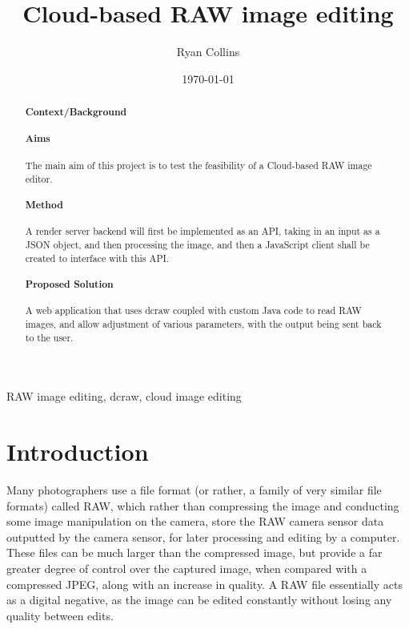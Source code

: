 \documentclass[12pt,a4paper]{article}
\title{Cloud-based RAW image editing}
\author{Ryan Collins}
\date{\today}
\begin{document}
\maketitle

\begin{abstract}
\paragraph{Context/Background}

\paragraph{Aims}
The main aim of this project is to test the feasibility of a Cloud-based RAW image
editor.
\paragraph{Method}
A render server backend will first be implemented as an API, taking in an input as a
JSON object, and then processing the image, and then a JavaScript
client shall be created to interface with this API.
\paragraph{Proposed Solution}
A web application that uses dcraw coupled with custom Java code to read RAW images,
and allow adjustment of various parameters, with the output being sent back to the user.
\end{abstract}

\begin{keywords}
RAW image editing, dcraw, cloud image editing
\end{keywords}

\section{Introduction}

Many photographers use a file format (or rather, a family of very similar file formats) called RAW,
which rather than compressing the image and conducting some image manipulation on the camera,
store the RAW camera sensor data outputted by the camera sensor, for later processing and editing
by a computer. These files can be much larger than the compressed image, but provide a far greater
degree of control over the captured image, when compared with a compressed JPEG, along with an
increase in quality. A RAW file essentially acts as a digital negative, as the image can be edited
constantly without losing any quality between edits.  \cite{AllAboutTheFormat}
\end{document}
